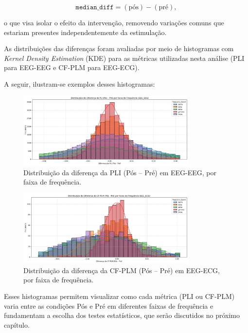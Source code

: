 \[
\texttt{median\_diff} = (\text{pós}) - (\text{pré}),
\]

o que visa isolar o efeito da intervenção, removendo variações comuns que estariam presentes independentemente da estimulação.

As distribuições das diferenças foram avaliadas por meio de histogramas com \emph{Kernel Density Estimation} (KDE) para as métricas utilizadas nesta análise (PLI para EEG-EEG e CF-PLM para EEG-ECG).

A seguir, ilustram-se exemplos desses histogramas:

\begin{figure}[htb]
    \centering
    \includegraphics[width=0.8\textwidth]{figs/6_distribuicao_metricas_conectividade/Distribuição_da_Diferença_da_PLI_(Pós_-_Pré)_por_Faixa_de_Frequência_EEG_EEG.png}
    \caption{Distribuição da diferença da PLI (Pós -- Pré) em EEG-EEG, por faixa de frequência.}
    \label{fig:pli_freq_eeg_eeg}
\end{figure}

\begin{figure}[htb]
    \centering
    \includegraphics[width=0.8\textwidth]{figs/6_distribuicao_metricas_conectividade/Distribuição_da_Diferença_da_CF-PLM_(Pós_-_Pré)_por_Faixa_de_Frequência_EEG_ECG.png}
    \caption{Distribuição da diferença da CF-PLM (Pós -- Pré) em EEG-ECG, por faixa de frequência.}
    \label{fig:cf_plm_freq_eeg_ecg}
\end{figure}

Esses histogramas permitem visualizar como cada métrica (PLI ou CF-PLM) varia entre as condições Pós e Pré em diferentes faixas de frequência e fundamentam a escolha dos testes estatísticos, que serão discutidos no próximo capítulo.
